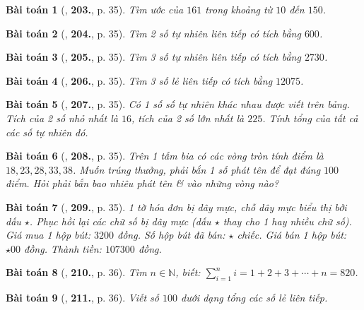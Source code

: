 \documentclass{article}
\numberwithin{equation}{section}
\newtheorem{baitoan}{Bài toán}[section]
\begin{document}
\begin{baitoan}[\cite{Binh_Toan_6_tap_1}, \textbf{203.}, p. 35]
	Tìm ước của $161$ trong khoảng từ $10$ đến $150$.
\end{baitoan}

\begin{baitoan}[\cite{Binh_Toan_6_tap_1}, \textbf{204.}, p. 35]
	Tìm 2 số tự nhiên liên tiếp có tích bằng $600$.
\end{baitoan}

\begin{baitoan}[\cite{Binh_Toan_6_tap_1}, \textbf{205.}, p. 35]
	Tìm 3 số tự nhiên liên tiếp có tích bằng $2730$.
\end{baitoan}

\begin{baitoan}[\cite{Binh_Toan_6_tap_1}, \textbf{206.}, p. 35]
	Tìm 3 số lẻ liên tiếp có tích bằng $12075$.
\end{baitoan}

\begin{baitoan}[\cite{Binh_Toan_6_tap_1}, \textbf{207.}, p. 35]
	Có 1 số số tự nhiên khác nhau được viết trên bảng. Tích của 2 số nhỏ nhất là $16$, tích của 2 số lớn nhất là $225$. Tính tổng của tất cả các số tự nhiên đó.
\end{baitoan}

\begin{baitoan}[\cite{Binh_Toan_6_tap_1}, \textbf{208.}, p. 35]
	Trên 1 tấm bia có các vòng tròn tính điểm là $18,23,28,33,38$. Muốn trúng thưởng, phải bắn 1 số phát tên để đạt đúng $100$ điểm. Hỏi phải bắn bao nhiêu phát tên \& vào những vòng nào?
\end{baitoan}

\begin{baitoan}[\cite{Binh_Toan_6_tap_1}, \textbf{209.}, p. 35]
	1 tờ hóa đơn bị dây mực, chỗ dây mực biểu thị bởi dấu $\star$. Phục hồi lại các chữ số bị dây mực (dấu $\star$ thay cho 1 hay nhiều chữ số). Giá mua 1 hộp bút: $3200$ đồng. Số hộp bút đã bán: $\star$ chiếc. Giá bán 1 hộp bút: $\star00$ đồng. Thành tiền: $107300$ đồng.
\end{baitoan}

\begin{baitoan}[\cite{Binh_Toan_6_tap_1}, \textbf{210.}, p. 36]
	Tìm $n\in\mathbb{N}$, biết: $\sum_{i=1}^n i = 1 + 2 + 3 + \cdots + n = 820$.
\end{baitoan}

\begin{baitoan}[\cite{Binh_Toan_6_tap_1}, \textbf{211.}, p. 36]
	Viết số $100$ dưới dạng tổng các số lẻ liên tiếp.
\end{baitoan}
\end{document}
